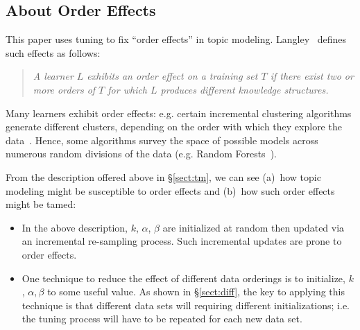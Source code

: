 \documentclass[twocolumn,5p,sort&compress]{elsarticle}
\newcommand{\tion}[1]{{\S}\ref{sect:#1}}
\newcommand{\bi}{\begin{itemize}}
\newcommand{\ei}{\end{itemize}}
\theoremstyle{break}
\begin{document}
\subsection{About Order Effects}

\noindent
This paper uses tuning to fix ``order effects'' in topic modeling. Langley~\cite{GENNARI198911} defines such effects as follows:
\begin{quote}
{\em A learner $L$ exhibits an order effect on a training set  $T$ if there exist
two or more orders of $T$ for which $L$ produces different knowledge structures.}
\end{quote}
Many learners exhibit order effects: e.g. certain incremental clustering algorithms generate different
clusters, depending on the order with which they explore the data~\cite{GENNARI198911}.
Hence, some algorithms survey the space of possible models across numerous
random divisions of the data (e.g. Random Forests~\cite{Breiman2001}).

From the description offered above in \S\ref{sect:tm},
we can see (a)~how topic modeling might be susceptible to order effects and (b)~how such order
effects might be tamed:
\bi
\item
  In the above description, $k$, $\alpha$, $\beta$ are initialized at random
then updated via an incremental re-sampling process. Such incremental updates are prone to order effects.
\item
  One technique to reduce the effect of different data orderings is to initialize, $k$, $\alpha,\beta$ to some
  useful value. As shown in \tion{diff},
the key to  applying this technique is that different data sets will requiring different
  initializations; i.e. the tuning process will have to be repeated for each new data set.
\ei
  





\end{document}
